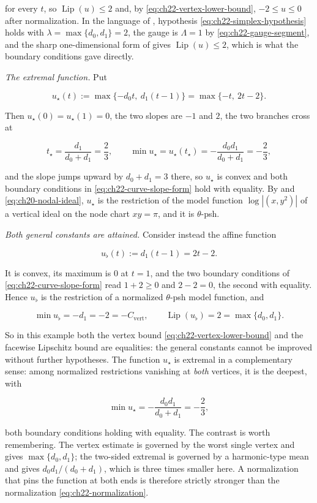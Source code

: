 \begin{example}
for every $t$, so $\operatorname{Lip}(u)\leq2$ and, by
\eqref{eq:ch22-vertex-lower-bound}, $-2\leq u\leq0$ after normalization.
In the language of , hypothesis
\eqref{eq:ch22-simplex-hypothesis} holds with
$\lambda=\max\{d_0,d_1\}=2$, the gauge is $\Lambda=1$ by
\eqref{eq:ch22-gauge-segment}, and the sharp one-dimensional form of
 gives $\operatorname{Lip}(u)\leq2$, which
is what the boundary conditions gave directly.

\emph{The extremal function.}  Put

\[
 u_\star(t):=\max\{-d_0t,\ d_1(t-1)\}=\max\{-t,\ 2t-2\}.
\tag{22.57}\label{eq:ch22-extremal-segment}
\]

Then $u_\star(0)=u_\star(1)=0$, the two slopes are $-1$ and $2$, the
two branches cross at

\[
 t_\star=\frac{d_1}{d_0+d_1}=\frac23,
 \qquad
 \min u_\star=u_\star(t_\star)=-\frac{d_0d_1}{d_0+d_1}=-\frac23 ,
\]

and the slope jumps upward by $d_0+d_1=3$ there, so $u_\star$ is convex
and both boundary conditions in \eqref{eq:ch22-curve-slope-form} hold with
equality.  By  and
\eqref{eq:ch20-nodal-ideal}, $u_\star$ is the restriction of the model
function $\log|(x,y^2)|$ of a vertical ideal on the node chart
$xy=\pi$, and it is $\theta$-psh.

\emph{Both general constants are attained.}  Consider instead the affine
function

\[
 u_\flat(t):=d_1(t-1)=2t-2 .
\tag{22.58}\label{eq:ch22-flat-extremal}
\]

It is convex, its maximum is $0$ at $t=1$, and the two boundary
conditions of \eqref{eq:ch22-curve-slope-form} read $1+2\geq0$ and
$2-2=0$, the second with equality.  Hence $u_\flat$ is the restriction
of a normalized $\theta$-psh model function, and

\[
 \min u_\flat=-d_1=-2=-C_{\mathrm{vert}},
 \qquad
 \operatorname{Lip}(u_\flat)=2=\max\{d_0,d_1\}.
\tag{22.59}\label{eq:ch22-segment-sharp-constants}
\]

So in this example both the vertex bound
\eqref{eq:ch22-vertex-lower-bound} and the facewise Lipschitz bound are
equalities: the general constants cannot be improved without further
hypotheses.  The function $u_\star$ is extremal in a complementary sense:
among normalized restrictions vanishing at \emph{both} vertices, it is the
deepest, with

\[
 \min u_\star=-\frac{d_0d_1}{d_0+d_1}=-\frac23 ,
\]

both boundary conditions holding with equality.  The contrast is worth
remembering.  The vertex estimate is governed by the worst single vertex and
gives $\max\{d_0,d_1\}$; the two-sided extremal is governed by a
harmonic-type mean and gives $d_0d_1/(d_0+d_1)$, which is three times
smaller here.  A normalization that pins the function at both ends is
therefore strictly stronger than the normalization
\eqref{eq:ch22-normalization}.
\end{example}

